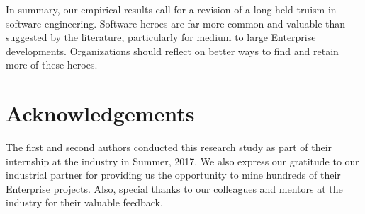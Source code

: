 \documentclass[sigconf]{acmart}
\theoremstyle{break}
\begin{document}
In summary, our empirical results call for a revision of a long-held truism in software engineering.
Software heroes are far more common and valuable than suggested by the literature,
particularly for medium to large  Enterprise developments. Organizations should reflect on better ways
to find and retain more of these heroes.

\section{Acknowledgements}
\label{sec:ack}

The first and second authors conducted this research study as part
of their internship at the industry in Summer, 2017. We also express our gratitude to our industrial  partner for providing us the opportunity to mine hundreds
of their
Enterprise projects. Also,
special thanks to our colleagues and mentors at the industry for
their valuable feedback.

\balance



%
 
\end{document}
